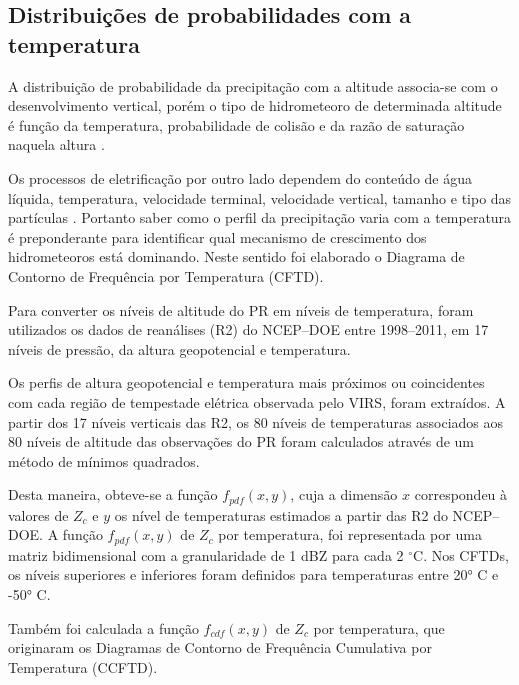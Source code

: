 \subsection{Distribuições de probabilidades com a temperatura}

A distribuição de probabilidade da precipitação com a altitude associa-se com o desenvolvimento vertical, porém o tipo de hidrometeoro de determinada altitude é função da temperatura, probabilidade de colisão  e da razão de saturação naquela altura \cite[p.~263]{mason1971_2ed}. 

Os processos de eletrificação por outro lado dependem do conteúdo de água líquida, temperatura, velocidade terminal, velocidade vertical, tamanho e tipo das partículas \cite{Takahashi1978,Saunders1999,Takahashi2002,avila2009}. Portanto saber como o perfil da precipitação varia com a temperatura é preponderante para identificar qual mecanismo de crescimento dos hidrometeoros está dominando. Neste sentido foi elaborado o Diagrama de Contorno de Frequência por Temperatura (CFTD).  


Para converter os níveis de altitude do PR em níveis de temperatura, foram utilizados os dados de reanálises (R2) do NCEP--DOE entre 1998--2011, em 17 níveis de pressão, da altura geopotencial e temperatura.


Os perfis de altura geopotencial e temperatura mais próximos ou coincidentes com cada região de tempestade elétrica observada pelo VIRS, foram extraídos. A partir dos 17 níveis verticais das R2, os 80 níveis de temperaturas associados aos 80 níveis de altitude das observações do PR foram calculados através de um método de mínimos quadrados.

Desta maneira, obteve-se a função $f_{pdf}(x,y)$, cuja a dimensão $x$ correspondeu à valores de $Z_{c}$ e $y$ os nível de temperaturas estimados a partir das R2 do NCEP--DOE. A função $f_{pdf}(x,y)$ de $Z_c$ por temperatura, foi representada por uma matriz bidimensional com a granularidade de 1 dBZ para cada 2 $^{\circ}$C. Nos CFTDs, os níveis superiores e inferiores foram definidos para temperaturas entre 20° C e -50° C.

Também foi calculada a função $f_{cdf}(x,y)$ de $Z_c$ por temperatura, que originaram os Diagramas de Contorno de Frequência Cumulativa por Temperatura (CCFTD).     
